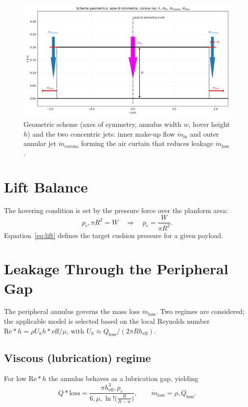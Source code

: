 \documentclass[11pt,a4paper]{article}
\begin{document}
\begin{figure}[t]
\centering
\includegraphics[width=0.95\linewidth]{./figures/schema_geometry.png}
\caption{Geometric scheme (axes of symmetry, annulus width $w$, hover height $h$) and the two concentric jets: inner make-up flow $\dot m_{\mathrm{in}}$ and outer annular jet $\dot m_{\mathrm{corona}}$ forming the air curtain that reduces leakage $\dot m_{\mathrm{loss}}$.}
\label{fig:geometry}
\end{figure}

\section{Lift Balance}
The hovering condition is set by the pressure force over the planform area:
\begin{equation}
p_c,\pi R^2 = W \quad \Rightarrow \quad p_c = \frac{W}{\pi R^2}.
\label{eq:lift}
\end{equation}
Equation~\eqref{eq:lift} defines the target cushion pressure for a given payload.

\section{Leakage Through the Peripheral Gap}
The peripheral annulus governs the mass loss $\dot m_{\mathrm{loss}}$. Two regimes are considered; the applicable model is selected based on the local Reynolds number $\mathrm{Re}*h=\rho U_h h*{\mathrm{eff}}/\mu$, with $U_h\approx Q_{\mathrm{loss}}/(2\pi R h_{\mathrm{eff}})$.

\subsection*{Viscous (lubrication) regime}
For low $\mathrm{Re}*h$ the annulus behaves as a lubrication gap, yielding
\begin{equation}
Q*{\mathrm{loss}} = \frac{\pi h_{\mathrm{eff}}^3,p_c}{6,\mu,\ln!\big(\tfrac{R}{R-w}\big)},
\qquad \dot m_{\mathrm{loss}}=\rho,Q_{\mathrm{loss}}.
\label{eq:qloss_lub}
\end{equation}
\end{document}
